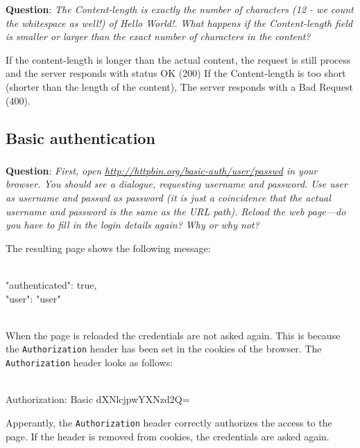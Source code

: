 \documentclass{article}
\begin{document}
\textbf{Question}: \textit{The Content-­length is exactly the number of characters (12 - we count the whitespace as well!) of Hello World!. What happens if the Content-length field is smaller or larger than the exact number of characters in the content?}

If the content-length is longer than the actual content, the request is still process and the server responds with status OK (200)
If the Content-length is too short (shorter than the length of the content), The server responds with a Bad Request (400).

\subsection{Basic authentication}

\subsubsection{}
\textbf{Question}: \textit{First, open \href{http://httpbin.org/basic-auth/user/passwd}{http://httpbin.org/basic-auth/user/passwd} in your browser. You should see a dialogue, requesting username and password. Use user as username and passwd as password (it is just a coincidence that the actual username and password is the same as the URL path). Reload the web page—do you have to fill in the login details again? Why or why not?}

The resulting page shows the following message:

\begin{texttt}
{\\
  "authenticated": true, \\
  "user": "user"\\
}\\
\end{texttt}


When the page is reloaded the credentials are not asked again. This is because the \texttt{Authorization} header has been set in the cookies of the browser. The \texttt{Authorization} header looks as follows:

\begin{texttt}
{\\
Authorization: Basic dXNlcjpwYXNzd2Q=
}\\
\end{texttt}

Apperantly, the \texttt{Authorization} header correctly authorizes the access to the page. If the header is removed from cookies, the credentials are asked again.
\end{document}
